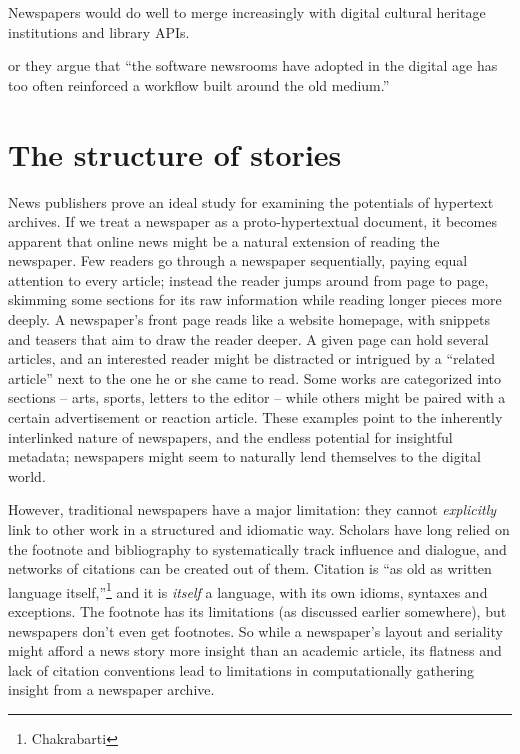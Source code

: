 Newspapers would do well to merge increasingly with digital cultural heritage institutions and library APIs. 

or they argue that ``the software newsrooms have adopted in the digital age has too often reinforced a workflow built around the old medium.''


\section{The structure of stories}



News publishers prove an ideal study for examining the potentials of hypertext archives. If we treat a newspaper as a proto-hypertextual document, it becomes apparent that online news might be a natural extension of reading the newspaper. Few readers go through a newspaper sequentially, paying equal attention to every article; instead the reader jumps around from page to page, skimming some sections for its raw information while reading longer pieces more deeply. A newspaper's front page reads like a website homepage, with snippets and teasers that aim to draw the reader deeper. A given page can hold several articles, and an interested reader might be distracted or intrigued by a ``related article'' next to the one he or she came to read. Some works are categorized into sections -- arts, sports, letters to the editor -- while others might be paired with a certain advertisement or reaction article. These examples point to the inherently interlinked nature of newspapers, and the endless potential for insightful metadata; newspapers might seem to naturally lend themselves to the digital world.

However, traditional newspapers have a major limitation: they cannot \emph{explicitly} link to other work in a structured and idiomatic way. Scholars have long relied on the footnote and bibliography to systematically track influence and dialogue, and networks of citations can be created out of them. Citation is ``as old as written language itself,''\footnote{Chakrabarti} and it is \emph{itself} a language, with its own idioms, syntaxes and exceptions. The footnote has its limitations (as discussed earlier somewhere), %
but newspapers don't even get footnotes. So while a newspaper's layout and seriality might afford a news story more insight than an academic article, its flatness and lack of citation conventions lead to limitations in computationally gathering insight from a newspaper archive.

